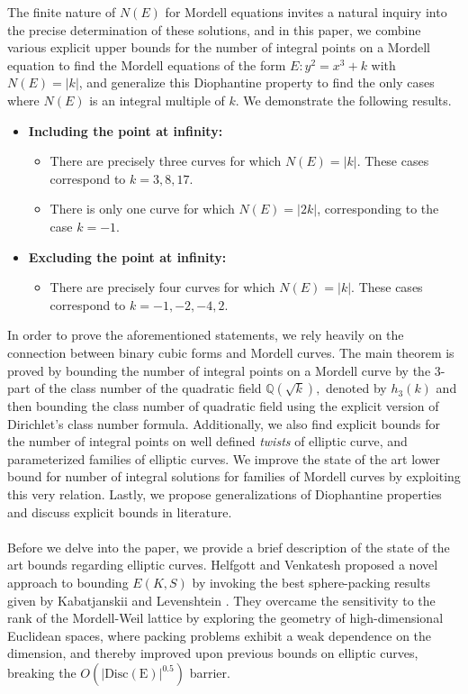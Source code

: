\documentclass[12pt]{amsart}
\theoremstyle{plain}
\theoremstyle{definition}
\theoremstyle{remark}
\numberwithin{equation}{section}
\numberwithin{thm}{section}
\theoremstyle{named}
\theoremstyle{named}
\begin{document}
The finite nature of $N(E)$ for Mordell equations invites a natural inquiry into the precise determination of these solutions, and in this paper, we combine various explicit upper bounds for the number of integral points on a Mordell equation to find the Mordell equations of the form $E: y^2 = x^3 + k$ with $N(E) = |k|$, and generalize this Diophantine property to find the only cases where $N(E)$ is an integral multiple of $k.$ We demonstrate the following results.
\begin{itemize}
  \item \textbf{{Including the point at infinity:}}
    \begin{itemize}
      \item There are precisely three curves for which $N(E) = |k|$. These cases correspond to $k = 3, 8, 17$.
      \item There is only one curve for which $N(E) = |2k|$, corresponding to the case $k = -1$.
    \end{itemize}
  \item \textbf{{Excluding the point at infinity:}}
    \begin{itemize}
      \item There are precisely four curves for which $N(E) = |k|$. These cases correspond to $k = -1, -2, -4, 2$.
    \end{itemize}
\end{itemize}
In order to prove the aforementioned statements, we rely heavily on the connection between binary cubic forms and Mordell curves. The main theorem is proved by bounding the number of integral points on a Mordell curve by the $3$-part of the class number of the quadratic field $\mathbb{Q}(\sqrt k),$ denoted by $h_3(k)$ and then bounding the class number of quadratic field using the explicit version of Dirichlet's class number formula. Additionally, we also find explicit bounds for the number of integral points on well defined \emph{twists} of elliptic curve, and parameterized families of elliptic curves. We improve the state of the art lower bound for number of integral solutions for families of Mordell curves by exploiting this very relation. Lastly, we propose generalizations of Diophantine properties and discuss explicit bounds in literature. \\  \\ 
Before we delve into the paper, we provide a brief description of the state of the art bounds regarding elliptic curves. \noindent 
{Helfgott and Venkatesh} \cite{helfgott2005integral} proposed a novel approach to bounding \( E(K,S) \) by invoking the best sphere-packing results given by {Kabatjanskii and Levenshtein} \cite{KabLev78}. They overcame the  sensitivity to the rank of the Mordell-Weil lattice by exploring the geometry of high-dimensional Euclidean spaces, where packing problems exhibit a weak dependence on the dimension, and thereby improved upon previous bounds on elliptic curves, breaking the $O(\mathrm{|Disc(E)}|^{0.5})$ barrier.
\end{document}
